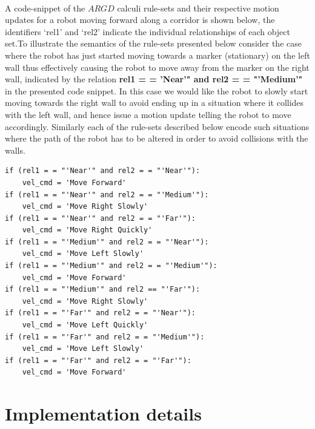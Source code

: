 \paragraph{}A code-snippet of the $ARGD$ calculi rule-sets and their respective motion updates for a robot moving forward along a corridor is shown below, the identifiers `rel1' and `rel2' indicate the individual relationships of each object set.To illustrate the semantics of the rule-sets presented below consider the case where the robot has just started moving towards a marker (stationary) on the left wall thus effectively causing the robot to move away from the marker on the right wall, indicated by the relation \textbf{rel1 = = 'Near'" and rel2 = = "'Medium'"} in the presented code snippet. In this case we would like the robot to slowly start moving towards the right wall to avoid ending up in a situation where it collides with the left wall, and hence issue a motion update telling the robot to move accordingly. Similarly each of the rule-sets described below encode such situations where the path of the robot has to be altered in order to avoid collisions with the walls.
\begin{lstlisting}
if (rel1 = = "'Near'" and rel2 = = "'Near'"):
	vel_cmd = 'Move Forward'
if (rel1 = = "'Near'" and rel2 = = "'Medium'"):
	vel_cmd = 'Move Right Slowly'
if (rel1 = = "'Near'" and rel2 = = "'Far'"):
	vel_cmd = 'Move Right Quickly'
if (rel1 = = "'Medium'" and rel2 = = "'Near'"):
	vel_cmd = 'Move Left Slowly'
if (rel1 = = "'Medium'" and rel2 = = "'Medium'"):
	vel_cmd = 'Move Forward'
if (rel1 = = "'Medium'" and rel2 == "'Far'"):
	vel_cmd = 'Move Right Slowly'
if (rel1 = = "'Far'" and rel2 = = "'Near'"):
	vel_cmd = 'Move Left Quickly'
if (rel1 = = "'Far'" and rel2 = = "'Medium'"):
	vel_cmd = 'Move Left Slowly'
if (rel1 = = "'Far'" and rel2 = = "'Far'"):
	vel_cmd = 'Move Forward'
\end{lstlisting}

\section{Implementation details}

